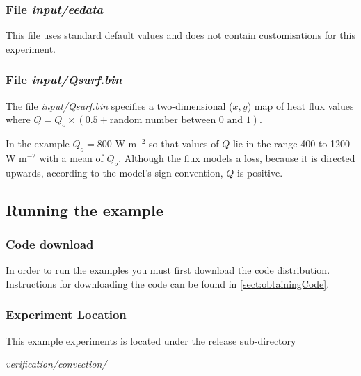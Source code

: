 \subsubsection{File {\it input/eedata}}

This file uses standard default values and does not contain
customisations for this experiment.


\subsubsection{File {\it input/Qsurf.bin}}

The file {\it input/Qsurf.bin} specifies a two-dimensional ($x,y$) 
map of heat flux values where 
$Q = Q_o \times ( 0.5 + \mbox{random number between 0 and 1})$.

In the example $Q_o = 800$ W m$^{-2}$ so that values of $Q$ lie in the range 400 to
1200 W m$^{-2}$ with a mean of $Q_o$. Although the flux models a loss, because it is
directed upwards, according to the model's sign convention, $Q$ is positive.


\begin{figure}
\begin{center}
\end{center}
\caption{
}
\label{FIG:eg-bconv-Qsurf}
\end{figure}

\subsection{Running the example}

\subsubsection{Code download}

In order to run the examples you must first download the code distribution.
Instructions for downloading the code can be found in \ref{sect:obtainingCode}.

\subsubsection{Experiment Location}

 This example experiments is located under the release sub-directory

\vspace{5mm}
{\it verification/convection/ }

